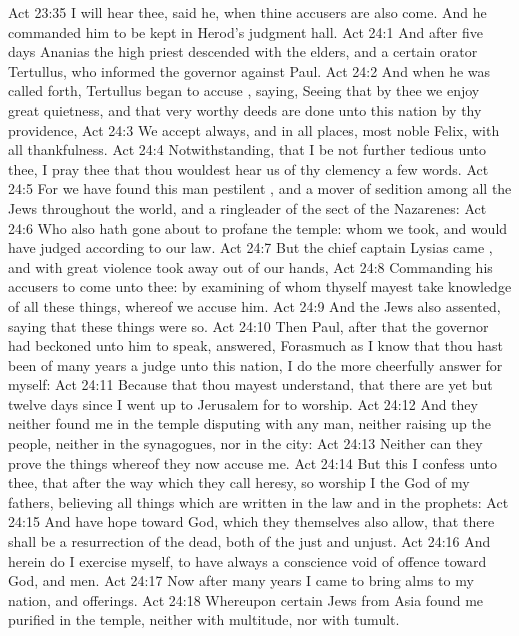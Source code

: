 \vs Act 23:35 I will hear thee, said he, when thine accusers are also come. And he commanded him to be kept in Herod's judgment hall.
\vs Act 24:1 And after five days Ananias the high priest descended with the elders, and  a certain orator  Tertullus, who informed the governor against Paul.
\vs Act 24:2 And when he was called forth, Tertullus began to accuse , saying, Seeing that by thee we enjoy great quietness, and that very worthy deeds are done unto this nation by thy providence,
\vs Act 24:3 We accept  always, and in all places, most noble Felix, with all thankfulness.
\vs Act 24:4 Notwithstanding, that I be not further tedious unto thee, I pray thee that thou wouldest hear us of thy clemency a few words.
\vs Act 24:5 For we have found this man  pestilent , and a mover of sedition among all the Jews throughout the world, and a ringleader of the sect of the Nazarenes:
\vs Act 24:6 Who also hath gone about to profane the temple: whom we took, and would have judged according to our law.
\vs Act 24:7 But the chief captain Lysias came , and with great violence took  away out of our hands,
\vs Act 24:8 Commanding his accusers to come unto thee: by examining of whom thyself mayest take knowledge of all these things, whereof we accuse him.
\vs Act 24:9 And the Jews also assented, saying that these things were so.
\vs Act 24:10 Then Paul, after that the governor had beckoned unto him to speak, answered, Forasmuch as I know that thou hast been of many years a judge unto this nation, I do the more cheerfully answer for myself:
\vs Act 24:11 Because that thou mayest understand, that there are yet but twelve days since I went up to Jerusalem for to worship.
\vs Act 24:12 And they neither found me in the temple disputing with any man, neither raising up the people, neither in the synagogues, nor in the city:
\vs Act 24:13 Neither can they prove the things whereof they now accuse me.
\vs Act 24:14 But this I confess unto thee, that after the way which they call heresy, so worship I the God of my fathers, believing all things which are written in the law and in the prophets:
\vs Act 24:15 And have hope toward God, which they themselves also allow, that there shall be a resurrection of the dead, both of the just and unjust.
\vs Act 24:16 And herein do I exercise myself, to have always a conscience void of offence toward God, and  men.
\vs Act 24:17 Now after many years I came to bring alms to my nation, and offerings.
\vs Act 24:18 Whereupon certain Jews from Asia found me purified in the temple, neither with multitude, nor with tumult.
